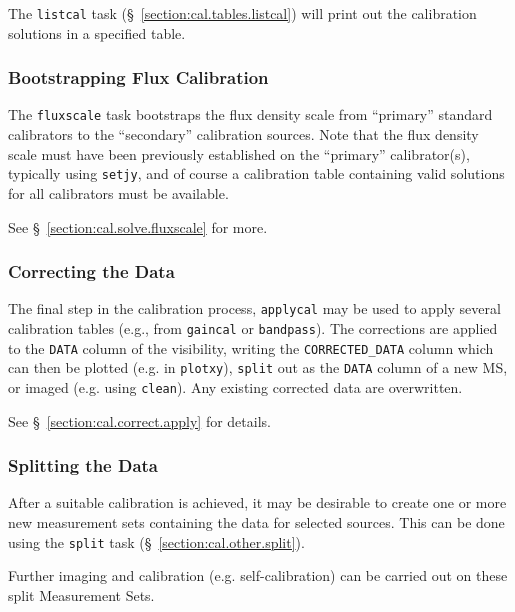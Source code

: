The {\tt listcal} task (\S~\ref{section:cal.tables.listcal}) will print out
the calibration solutions in a specified table.

\subsubsection{Bootstrapping Flux Calibration}
\label{section:intro.walkthru.calib.fluxscale}

The {\tt fluxscale} task bootstraps the flux density scale from
``primary'' standard calibrators to the ``secondary'' calibration
sources.  Note that the flux density scale must have been previously
established on the ``primary'' calibrator(s), typically using 
{\tt setjy}, and of course a calibration table containing
valid solutions for all calibrators must be available.

See \S~\ref{section:cal.solve.fluxscale} for more.

\subsubsection{Correcting the Data}
\label{section:intro.walkthru.calib.applycal}

The final step in the calibration process, {\tt applycal} may be used
to apply several calibration tables (e.g., from {\tt gaincal} or
{\tt bandpass}). 
The corrections are applied to the {\tt DATA} column of the
visibility, writing the {\tt CORRECTED\_DATA} column which can then be
plotted (e.g. in {\tt plotxy}), {\tt split} out as the {\tt DATA}
column of a new MS, or imaged (e.g. using {\tt clean}).  Any existing
corrected data are overwritten.

See \S~\ref{section:cal.correct.apply} for details.
 

 

\subsubsection{Splitting the Data}
\label{section:intro.walkthru.calib.split}

After a suitable calibration is achieved, it may be desirable to
create one or more new measurement sets containing the data for
selected sources.  This can be done using the {\tt split} task
(\S~\ref{section:cal.other.split}).

Further imaging and calibration (e.g. self-calibration) can be
carried out on these split Measurement Sets.



